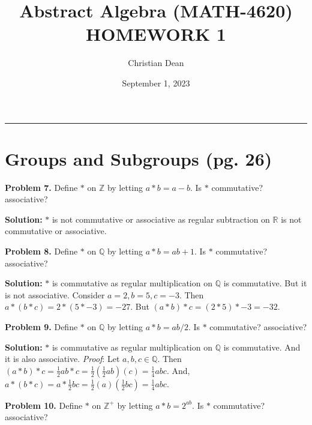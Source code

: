 \documentclass[12pt, letterpaper]{article}
\title{Abstract Algebra (MATH-4620) HOMEWORK 1}
\author{Christian Dean}
\date{September 1, 2023}
\newenvironment{problem}
    [1]
    {\noindent \textbf{Problem #1.}}
    {\vspace{3mm}}
\newenvironment{solution}
    [0]
    {\noindent \textbf{Solution:}} 
    {\vspace{3mm}}
\begin{document}
\maketitle

\noindent\hfil\rule{16cm}{0.4pt}\hfil

\section{Groups and Subgroups (pg. 26)}
    \begin{problem}{7}
        Define $*$ on $\mathbb{Z}$ by letting $a*b=a-b$. Is $*$ commutative? 
        associative?
    \end{problem}

    \begin{solution}
        $*$ is not commutative or associative as regular subtraction on
        $\mathbb{R}$ is not commutative or associative.
    \end{solution}

    \begin{problem}{8}
        Define $*$ on $\mathbb{Q}$ by letting $a*b=ab+1$. Is $*$ commutative?
        associative?
    \end{problem}

    \begin{solution}
        $*$ is commutative as regular multiplication on $\mathbb{Q}$ is commutative.
        But it is not associative. Consider $a=2, b=5, c=-3$. Then $a * (b * c) = 
        2 * (5 * -3) = -27$. But $(a * b) * c = (2 * 5) * -3 = -32$.
    \end{solution}

    \begin{problem}{9}
        Define $*$ on $\mathbb{Q}$ by letting $a*b=ab/2$. Is $*$ commutative?
        associative?
    \end{problem}

    \begin{solution}
        $*$ is commutative as regular multiplication on $\mathbb{Q}$ is commutative.
        And it is also associative. \emph{Proof}: Let $a,b,c \in \mathbb{Q}$. Then
        $(a * b) * c = \frac{1}{2}ab * c = \frac{1}{2}(\frac{1}{2}ab)(c) = \frac{1}{4}abc$. 
        And, $a * (b * c) = a * \frac{1}{2}bc = \frac{1}{2}(a)(\frac{1}{2}bc) = \frac{1}{4}abc$.
    \end{solution}

    \begin{problem}{10}
        Define $*$ on $\mathbb{Z}^+$ by letting $a*b=2^{ab}$. Is $*$ commutative?
        associative?
    \end{problem}
\end{document}
